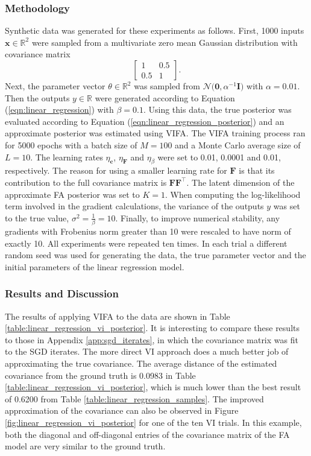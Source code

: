 \documentclass[msc,deptreport.inf]{infthesis} %
\newcommand{\matr}[1]{\mathbf{#1}}
\newcommand{\R}{\mathbb R}
\begin{document}
\subsubsection{Methodology}

Synthetic data was generated for these experiments as follows. First, 1000 inputs $\matr{x} \in \R^2$ were sampled from a multivariate zero mean Gaussian distribution with covariance matrix
\begin{equation}
	\begin{bmatrix}
		1 & 0.5 \\
		0.5 & 1
	\end{bmatrix}.
\end{equation}
Next, the parameter vector $\theta \in \R^2$ was sampled from $\mathcal{N}\big(\matr{0}, \alpha^{-1} \matr{I} \big)$ with $\alpha = 0.01$. Then the outputs $y \in \R$ were generated according to Equation (\ref{eqn:linear_regression}) with $\beta = 0.1$. Using this data, the true posterior was evaluated according to Equation (\ref{eqn:linear_regression_posterior}) and an approximate posterior was estimated using VIFA. The VIFA training process ran for 5000 epochs with a batch size of $M=100$ and a Monte Carlo average size of $L=10$.  The learning rates $\eta_\matr{c}$,  $\eta_\matr{F}$ and $\eta_\beta$ were set to 0.01, 0.0001 and 0.01, respectively. The reason for using a smaller learning rate for $\matr{F}$ is that its contribution to the full covariance matrix is $\matr{F}\matr{F}^\intercal$. The latent dimension of the approximate FA posterior was set to $K=1$. When computing the log-likelihood term involved in the gradient calculations, the variance of the outputs $y$ was set to the true value, $\sigma^2 = \frac{1}{\beta} = 10$. Finally, to improve numerical stability, any gradients with Frobenius norm greater than 10 were rescaled to have norm of exactly 10. All experiments were repeated ten times. In each trial a different random seed was used for generating the data, the true parameter vector and the initial parameters of the linear regression model. 

\subsubsection{Results and Discussion}

The results of applying VIFA to the data are shown in Table \ref{table:linear_regression_vi_posterior}. It is interesting to compare these results to those in Appendix \ref{app:sgd_iterates}, in which the covariance matrix was fit to the SGD iterates. The more direct VI approach does a much better job of approximating the true covariance. The average distance of the estimated covariance from the ground truth is 0.0983 in Table \ref{table:linear_regression_vi_posterior}, which is much lower than the best result of 0.6200 from Table \ref{table:linear_regression_samples}. The improved approximation of the covariance can also be observed in Figure \ref{fig:linear_regression_vi_posterior} for one of the ten VI trials. In this example, both the diagonal and off-diagonal entries of the covariance matrix of the FA model are very similar to the ground truth.
\end{document}

